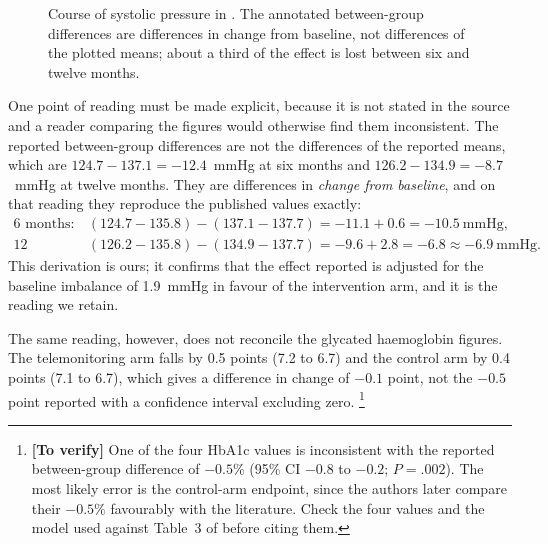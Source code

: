 \documentclass[12pt,a4paper,oneside]{report}
\newcommand{\verify}[1]{\footnote{\textbf{[To verify]} #1}}
\begin{document}
\begin{figure}[htbp]
\centering
{}
\caption{Course of systolic pressure in \textcite{mihevc2025}. The annotated between-group differences are differences in change from baseline, not differences of the plotted means; about a third of the effect is lost between six and twelve months.}\label{fig:mihevc}
\end{figure}

One point of reading must be made explicit, because it is not stated in the source and a reader comparing the figures would otherwise find them inconsistent. The reported between-group differences are not the differences of the reported means, which are $124.7 - 137.1 = -12.4$~mmHg at six months and $126.2 - 134.9 = -8.7$~mmHg at twelve months. They are differences in \emph{change from baseline}, and on that reading they reproduce the published values exactly:
\begin{align}
  \text{6 months:} \quad & (124.7-135.8) - (137.1-137.7) = -11.1 + 0.6 = -10.5~\text{mmHg},\\
  \text{12 months:} \quad & (126.2-135.8) - (134.9-137.7) = -9.6 + 2.8 = -6.8 \approx -6.9~\text{mmHg}.
\end{align}
This derivation is ours; it confirms that the effect reported is adjusted for the baseline imbalance of 1.9~mmHg in favour of the intervention arm, and it is the reading we retain.

The same reading, however, does not reconcile the glycated haemoglobin figures. The telemonitoring arm falls by 0.5 points (7.2 to 6.7) and the control arm by 0.4 points (7.1 to 6.7), which gives a difference in change of $-0.1$ point, not the $-0.5$ point reported with a confidence interval excluding zero.%
\verify{One of the four HbA1c values is inconsistent with the reported between-group difference of $-0.5\%$ (95\% CI $-0.8$ to $-0.2$; $P=.002$). The most likely error is the control-arm endpoint, since the authors later compare their $-0.5\%$ favourably with the literature. Check the four values and the model used against Table~3 of \textcite{mihevc2025} before citing them.}
\end{document}
